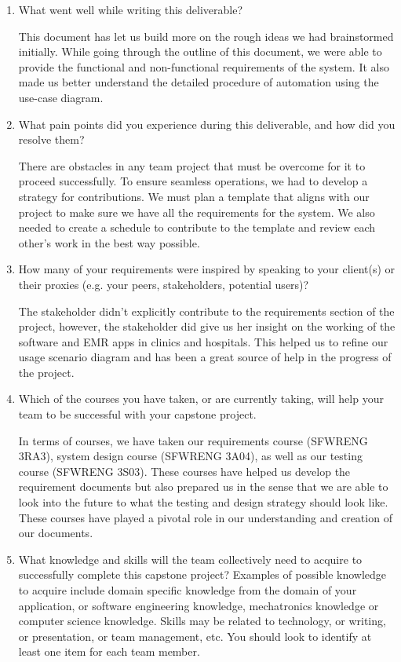 \documentclass[12pt]{article}
\begin{document}
\begin{enumerate}
  \item What went well while writing this deliverable?
  
  This document has let us build more on the rough ideas we had brainstormed initially. While going through the outline of this document, we were able to provide the functional and non-functional requirements of the system. It also made us better understand the detailed procedure of automation using the use-case diagram. 

  \item What pain points did you experience during this deliverable, and how did
  you resolve them?

  There are obstacles in any team project that must be overcome for it to proceed successfully. To ensure seamless operations, we had to develop a strategy for contributions. We must plan a template that aligns with our project to make sure we have all the requirements for the system. We also needed to create a schedule to contribute to the template and review each other’s work in the best way possible.
  
  \item How many of your requirements were inspired by speaking to your
  client(s) or their proxies (e.g. your peers, stakeholders, potential users)?

  The stakeholder didn’t explicitly contribute to the requirements section of the project, however, the stakeholder did give us her insight on the working of the software and EMR apps in clinics and hospitals. This helped us to refine our usage scenario diagram and has been a great source of help in the progress of the project.

  \item Which of the courses you have taken, or are currently taking, will help
  your team to be successful with your capstone project.

  In terms of courses, we have taken our requirements course (SFWRENG 3RA3), system design course (SFWRENG 3A04), as well as our testing course (SFWRENG 3S03). These courses have helped us develop the requirement documents but also prepared us in the sense that we are able to look into the future to what the testing and design strategy should look like. These courses have played a pivotal role in our understanding and creation of our documents. 

  \item What knowledge and skills will the team collectively need to acquire to
  successfully complete this capstone project?  Examples of possible knowledge
  to acquire include domain specific knowledge from the domain of your
  application, or software engineering knowledge, mechatronics knowledge or
  computer science knowledge.  Skills may be related to technology, or writing,
  or presentation, or team management, etc.  You should look to identify at
  least one item for each team member.


\end{enumerate}
\end{document}
